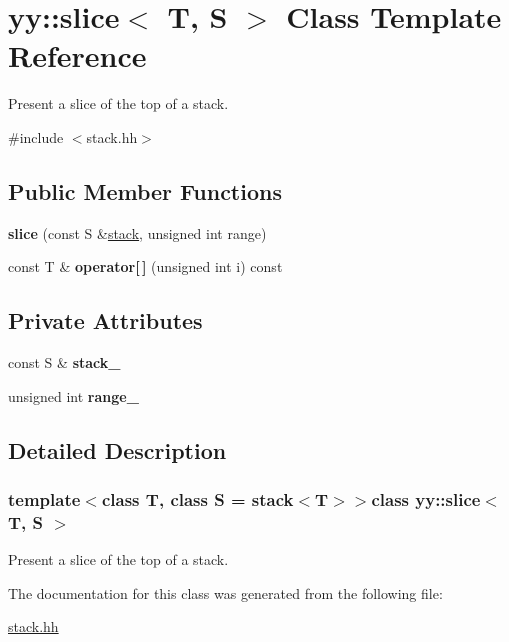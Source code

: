 \hypertarget{classyy_1_1slice}{\section{yy\-:\-:slice$<$ T, S $>$ Class Template Reference}
\label{classyy_1_1slice}
}


Present a slice of the top of a stack.  




{\ttfamily \#include $<$stack.\-hh$>$}

\subsection*{Public Member Functions}
\begin{DoxyCompactItemize}
\item 
\hypertarget{classyy_1_1slice_a09b1750a81ae90227fdceb482fa06797}{{\bfseries slice} (const S \&\hyperlink{classyy_1_1stack}{stack}, unsigned int range)}\label{classyy_1_1slice_a09b1750a81ae90227fdceb482fa06797}

\item 
\hypertarget{classyy_1_1slice_ad44e52c28c2962f9dd5bf327510c1237}{const T \& {\bfseries operator\mbox{[}$\,$\mbox{]}} (unsigned int i) const }\label{classyy_1_1slice_ad44e52c28c2962f9dd5bf327510c1237}

\end{DoxyCompactItemize}
\subsection*{Private Attributes}
\begin{DoxyCompactItemize}
\item 
\hypertarget{classyy_1_1slice_a0fe0ae83463e410ba2e2f6fc1e1d1fc4}{const S \& {\bfseries stack\-\_\-}}\label{classyy_1_1slice_a0fe0ae83463e410ba2e2f6fc1e1d1fc4}

\item 
\hypertarget{classyy_1_1slice_ab9c0f9775d55a20ebab97e056a7cd152}{unsigned int {\bfseries range\-\_\-}}\label{classyy_1_1slice_ab9c0f9775d55a20ebab97e056a7cd152}

\end{DoxyCompactItemize}


\subsection{Detailed Description}
\subsubsection*{template$<$class T, class S = stack$<$\-T$>$$>$class yy\-::slice$<$ T, S $>$}

Present a slice of the top of a stack. 

The documentation for this class was generated from the following file\-:\begin{DoxyCompactItemize}
\item 
\hyperlink{stack_8hh}{stack.\-hh}\end{DoxyCompactItemize}
